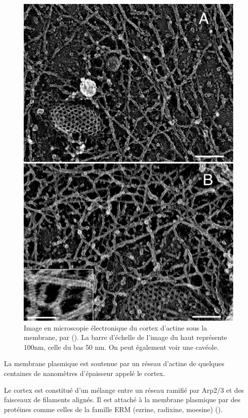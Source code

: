 \documentclass{report}
\begin{document}
\begin{figure}
\includegraphics[scale=0.25]{Figures/cortex.png} 
\caption{Image en microscopie électronique du cortex d'actine sous la membrane, par (\cite{morone_three-dimensional_2006}). La barre d'échelle de l'image du haut représente 100nm, celle du bas 50 nm. On peut également voir une cavéole.}
\end{figure}

La membrane plasmique est soutenue par un réseau d'actine de quelques centaines de nanomètres d'épaisseur appelé le cortex.

Le cortex est constitué d'un mélange entre un réseau ramifié par Arp2/3 et des faisceaux de filaments alignés. 
Il est attaché à la membrane plasmique par des protéines comme celles de la famille ERM (ezrine, radixine, moesine) (\cite{biro_cell_2013}). 
\end{document}
